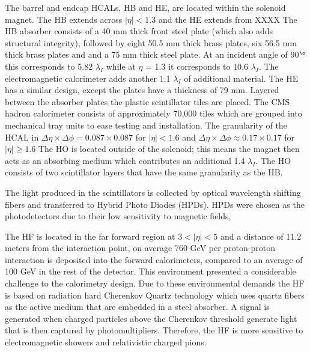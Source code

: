 The barrel and endcap HCALs, HB and HE, are located within the 
solenoid magnet. The HB extends across $|\eta|<1.3$ and the HE extends from XXXX
The HB absorber consists of a 40 mm thick front steel plate (which also adds structural integrity),
followed by eight 50.5 mm thick brass plates, six 56.5 mm thick brass plates and
and a 75 mm thick steel plate. At an incident angle of 90$^{\o}$ this corresponds %
to 5.82 $\lambda_{I}$ while at $\eta$ = 1.3 it corresponds to 10.6 $\lambda_{I}$.
The electromagnetic calorimeter adds another 1.1 $\lambda_{I}$ of additional
material. The HE has a similar design, except the plates have a thickness of 79 mm.
Layered between the absorber plates the plastic scintillator tiles are placed. The 
CMS hadron calorimeter consists of approximately 70,000 tiles which are grouped
into mechanical tray units to ease testing and installation.  
The granularity of the HCAL in $\Delta\eta \times \Delta\phi = 0.087 \times 0.087$
for $|\eta|<1.6$ and $\Delta\eta \times \Delta\phi \approx 0.17 \times 0.17$ for $|\eta|\ge1.6$
The HO is located outside of the solenoid; this means the magnet then acts as an absorbing
medium which contributes an additional 1.4 $\lambda_{I}$. The HO consists of two 
scintillator layers that have the same granularity as the HB. 

The light produced in the scintillators is collected by optical wavelength shifting fibers 
and transferred to Hybrid Photo Diodes (HPDs). HPDs were chosen as the photodetectors
due to their low sensitivity to magnetic fields, %

The HF is located in the far forward region at $3<|\eta|<5$ and a distance
of  11.2 meters from the interaction point, on average 760 GeV per 
proton-proton interaction is deposited into the forward calorimeters, compared
to an average of 100 GeV in the rest of the detector. This environment
presented a considerable challenge to the calorimetry design. Due to these 
environmental demands the HF is based on radiation hard Cherenkov Quartz technology
which uses quartz fibers as the active medium that are embedded in a steel absorber. 
A signal is generated when charged particles above the Cherenkov threshold %
generate light that is then captured by photomultipliers. Therefore, the HF is
more sensitive to electromagnetic showers and relativistic charged pions.



